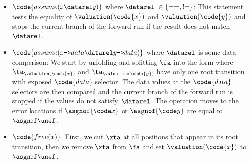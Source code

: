 \begin{itemize}
      \item $\code{assume(x \datarel y)}$ where $\datarel\ \in \{\mathtt{==},
        \mathtt{{!}{=}}\}$:
        This statement tests the equality of $\valuation(\code{x})$ and $\valuation(\code{y})$
        and stops the current branch of the forward run if the result does not match $\datarel$.
      \item $\code{assume(x\text{\texttt{->}}data \datarel y\text{\texttt{->}}data)}$
        where $\datarel$ is some data comparison:
        We start by unfolding and splitting $\fa$ into the form where
        $\ta_{\valuation(\code{x})}$ and $\ta_{\valuation(\code{y})}$ have only
        one root transition with exposed $\code{data}$ selector.
        The data values at the $\code{data}$ selectors are then compared and
        the current branch of the forward run is stopped if the values do not satisfy~$\datarel$.
        The operation moves to the error locations if $\asgnof{\code x}$ or
        $\asgnof{\code y}$ are equal to~$\asgnof \unef$.


		  \item $\code{free(x)}$:
        First, we cut $\xta$ at all positions that appear in its root
        transition, then we remove $\xta$ from $\fa$ and set
        $\valuation(\code{x})$ to $\asgnof \unef$. 
		\end{itemize}

